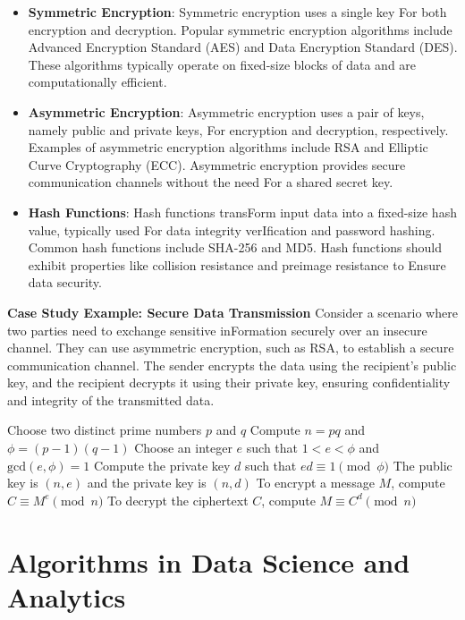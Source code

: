 \documentclass[12pt]{book} %
\begin{document}
\begin{itemize}
    \item \textbf{Symmetric Encryption}: Symmetric encryption uses a single key For both encryption and decryption. Popular symmetric encryption algorithms include Advanced Encryption Standard (AES) and Data Encryption Standard (DES). These algorithms typically operate on fixed-size blocks of data and are computationally efficient.
    
    \item \textbf{Asymmetric Encryption}: Asymmetric encryption uses a pair of keys, namely public and private keys, For encryption and decryption, respectively. Examples of asymmetric encryption algorithms include RSA and Elliptic Curve Cryptography (ECC). Asymmetric encryption provides secure communication channels without the need For a shared secret key.
    
    \item \textbf{Hash Functions}: Hash functions transForm input data into a fixed-size hash value, typically used For data integrity verIfication and password hashing. Common hash functions include SHA-256 and MD5. Hash functions should exhibit properties like collision resistance and preimage resistance to Ensure data security.
\end{itemize}

\textbf{Case Study Example: Secure Data Transmission}
Consider a scenario where two parties need to exchange sensitive inFormation securely over an insecure channel. They can use asymmetric encryption, such as RSA, to establish a secure communication channel. The sender encrypts the data using the recipient's public key, and the recipient decrypts it using their private key, ensuring confidentiality and integrity of the transmitted data.
\FloatBarrier
\begin{algorithmic}[1]
\State Choose two distinct prime numbers $p$ and $q$
\State Compute $n = pq$ and $\phi = (p-1)(q-1)$
\State Choose an integer $e$ such that $1 < e < \phi$ and $\text{gcd}(e,\phi) = 1$
\State Compute the private key $d$ such that $ed \equiv 1 \pmod{\phi}$
\State The public key is $(n, e)$ and the private key is $(n, d)$
\State To encrypt a message $M$, compute $C \equiv M^e \pmod{n}$
\State To decrypt the ciphertext $C$, compute $M \equiv C^d \pmod{n}$
\end{algorithmic}


\section{Algorithms in Data Science and Analytics}
\end{document}
